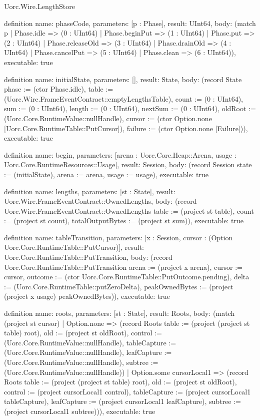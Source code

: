 \begin{lexlean}{Uorc.Wire.LengthStore}
\begin{semanticmodule}
definition{
  name: phaseCode,
  parameters: [p : Phase],
  result: UInt64,
  body: (match p
    | Phase.idle => (0 : UInt64)
    | Phase.beginPut => (1 : UInt64)
    | Phase.put => (2 : UInt64)
    | Phase.releaseOld => (3 : UInt64)
    | Phase.drainOld => (4 : UInt64)
    | Phase.cancelPut => (5 : UInt64)
    | Phase.clean => (6 : UInt64)),
  executable: true
}

definition{
  name: initialState,
  parameters: [],
  result: State,
  body: (record State {phase := (ctor Phase.idle), table := (Uorc.Wire.FrameEventContract::emptyLengthsTable), count := (0 : UInt64), sum := (0 : UInt64), length := (0 : UInt64), nextSum := (0 : UInt64), oldRoot := (Uorc.Core.RuntimeValue::nullHandle), cursor := (ctor Option.none [Uorc.Core.RuntimeTable::PutCursor]), failure := (ctor Option.none [Failure])}),
  executable: true
}

definition{
  name: begin,
  parameters: [arena : Uorc.Core.Heap::Arena, usage : Uorc.Core.RuntimeResources::Usage],
  result: Session,
  body: (record Session {state := (initialState), arena := arena, usage := usage}),
  executable: true
}

definition{
  name: lengths,
  parameters: [st : State],
  result: Uorc.Wire.FrameEventContract::OwnedLengths,
  body: (record Uorc.Wire.FrameEventContract::OwnedLengths {table := (project st table), count := (project st count), totalOutputBytes := (project st sum)}),
  executable: true
}

definition{
  name: tableTransition,
  parameters: [x : Session, cursor : (Option Uorc.Core.RuntimeTable::PutCursor)],
  result: Uorc.Core.RuntimeTable::PutTransition,
  body: (record Uorc.Core.RuntimeTable::PutTransition {arena := (project x arena), cursor := cursor, outcome := (ctor Uorc.Core.RuntimeTable::PutOutcome.pending), delta := (Uorc.Core.RuntimeTable::putZeroDelta), peakOwnedBytes := (project (project x usage) peakOwnedBytes)}),
  executable: true
}

definition{
  name: roots,
  parameters: [st : State],
  result: Roots,
  body: (match (project st cursor)
    | Option.none => (record Roots {table := (project (project st table) root), old := (project st oldRoot), control := (Uorc.Core.RuntimeValue::nullHandle), tableCapture := (Uorc.Core.RuntimeValue::nullHandle), leafCapture := (Uorc.Core.RuntimeValue::nullHandle), subtree := (Uorc.Core.RuntimeValue::nullHandle)})
    | Option.some cursorLocal1 => (record Roots {table := (project (project st table) root), old := (project st oldRoot), control := (project cursorLocal1 control), tableCapture := (project cursorLocal1 tableCapture), leafCapture := (project cursorLocal1 leafCapture), subtree := (project cursorLocal1 subtree)})),
  executable: true
}


\end{semanticmodule}
\end{lexlean}
